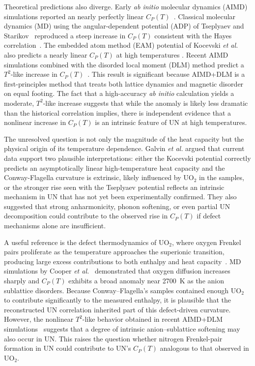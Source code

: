 \documentclass[preprint,12pt,sort&compress]{elsarticle}
\newcommand{\?}{\stackrel{?}{=}}
\begin{document}
Theoretical predictions also diverge. Early \textit{ab initio} molecular dynamics (AIMD) simulations reported an nearly perfectly linear $C_{P}(T)$~\cite{Kocevski2023}. Classical molecular dynamics (MD) using the angular-dependent potential (ADP) of Tseplyaev and Starikov~\cite{Kuksin2016,Tseplyaev2016} reproduced a steep increase in $C_P(T)$ consistent with the Hayes correlation~\cite{AbdulHameed2024}. The embedded atom method (EAM) potential of Kocevski \textit{et al.}~\cite{Kocevski2022II} also predicts a nearly linear $C_P(T)$ at high temperatures \cite{AbdulHameed2024}. Recent AIMD simulations combined with the disorded local moment (DLM) method predict a $T^{2}$-like increase in $C_P(T)$~\cite{AbdulHameed2025}. This result is significant because AIMD+DLM is a first-principles method that treats both lattice dynamics and magnetic disorder on equal footing. The fact that a high-accuracy \textit{ab initio} calculation yields a moderate, $T^{2}$-like increase suggests that while the anomaly is likely less dramatic than the historical correlation implies, there is independent evidence that a nonlinear increase in $C_{P}(T)$ is an intrinsic feature of UN at high temperatures.

The unresolved question is not only the magnitude of the heat capacity but the physical origin of its temperature dependence. Galvin \textit{et al.} \cite{Galvin2023} argued that current data support two plausible interpretations: either the Kocevski potential correctly predicts an asymptotically linear high-temperature heat capacity and the Conway-Flagella curvature is extrinsic, likely influenced by UO$_2$ in the samples, or the stronger rise seen with the Tseplyaev potential reflects an intrinsic mechanism in UN that has not yet been experimentally confirmed. They also suggested that strong anharmonicity, phonon softening, or even partial UN decomposition could contribute to the observed rise in $C_P(T)$ if defect mechanisms alone are insufficient.

A useful reference is the defect thermodynamics of UO$_2$, where oxygen Frenkel pairs proliferate as the temperature approaches the superionic transition, producing large excess contributions to both enthalpy and heat capacity~\cite{Pavlov2017}. MD simulations by Cooper \textit{et al.}~\cite{Cooper2014} demonstrated that oxygen diffusion increases sharply and $C_{P}(T)$ exhibits a broad anomaly near 2700~K as the anion sublattice disorders. Because Conway–Flagella's samples contained enough UO$_2$ to contribute significantly to the measured enthalpy, it is plausible that the reconstructed UN correlation inherited part of this defect-driven curvature. However, the nonlinear $T^{2}$-like behavior obtained in recent AIMD+DLM simulations~\cite{AbdulHameed2025} suggests that a degree of intrinsic anion–sublattice softening may also occur in UN. This raises the question whether nitrogen Frenkel-pair formation in UN could contribute to UN's $C_P(T)$ analogous to that observed in UO$_2$.
\end{document}
